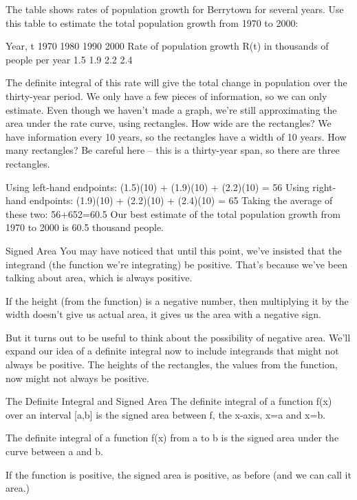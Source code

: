 \begin{example}
The table shows rates of population growth for Berrytown for several years. Use this table to estimate the total population growth from 1970 to 2000:

Year, t	1970	1980	1990	2000	Rate of population growth R(t) in thousands of people per year	1.5	1.9	2.2	2.4

\begin{solution}
The definite integral of this rate will give the total change in population over the thirty-year period. We only have a few pieces of information, so we can only estimate. Even though we haven't made a graph, we're still approximating the area under the rate curve, using rectangles. How wide are the rectangles? We have information every 10 years, so the rectangles have a width of 10 years. How many rectangles? Be careful here – this is a thirty-year span, so there are three rectangles.

Using left-hand endpoints: (1.5)(10) + (1.9)(10) + (2.2)(10) = 56
Using right-hand endpoints: (1.9)(10) + (2.2)(10) + (2.4)(10) = 65
Taking the average of these two:
56+652=60.5
Our best estimate of the total population growth from 1970 to 2000 is 60.5 thousand people.
\end{solution}\end{example}

Signed Area
You may have noticed that until this point, we've insisted that the integrand (the function we're integrating) be positive. That’s because we've been talking about area, which is always positive.

If the height (from the function) is a negative number, then multiplying it by the width doesn't give us actual area, it gives us the area with a negative sign.

But it turns out to be useful to think about the possibility of negative area. We’ll expand our idea of a definite integral now to include integrands that might not always be positive. The heights of the rectangles, the values from the function, now might not always be positive.

The Definite Integral and Signed Area
The definite integral of a function f(x) over an interval [a,b] is the signed area between f, the x-axis, x=a and x=b.

The definite integral of a function f(x) from a to b is the signed area under the curve between a and b.

If the function is positive, the signed area is positive, as before (and we can call it area.)

